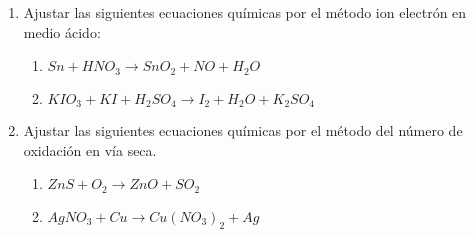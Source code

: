\documentclass[../Práctica.root.tex]{subfiles}
\newcommand{\lra}{\ensuremath{\longrightarrow{}}}
\begin{document}
\begin{enumerate}
    \item Ajustar las siguientes ecuaciones químicas por el método ion electrón en medio ácido:
          \begin{enumerate}
              \item $Sn + HNO_3 \lra SnO_2 + NO + H_2O$
              \item $KIO_3 + KI + H_2SO_4 \lra I_2 + H_2O + K_2SO_4$
          \end{enumerate}

    \item Ajustar las siguientes ecuaciones químicas por el método del número de oxidación en vía
          seca.
          \begin{enumerate}
              \item $ZnS + O_2 \lra ZnO + SO_2$
              \item $AgNO_3 + Cu \lra Cu(NO_3)_2 + Ag$
          \end{enumerate}
\end{enumerate}
\end{document}
